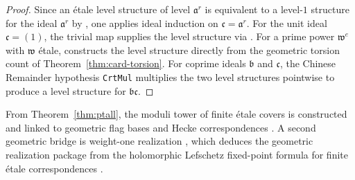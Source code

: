 \begin{proof}
Since an étale level structure of level $\mathfrak{a}^r$ is equivalent to a
level-$1$ structure for the ideal $\mathfrak{a}^r$ by , one
applies ideal induction on $\mathfrak{c} = \mathfrak{a}^r$. For the unit ideal
$\mathfrak{c} = (1)$, the trivial map supplies the level structure via
. For a prime power $\mathfrak{w}^e$ with $\mathfrak{w}$
étale, 
constructs the level structure directly from the geometric torsion count of
Theorem~\ref{thm:card-torsion}. For coprime ideals $\mathfrak{b}$ and
$\mathfrak{c}$, the Chinese Remainder hypothesis \texttt{CrtMul} multiplies the
two level structures pointwise to produce a level structure for
$\mathfrak{b}\mathfrak{c}$.
\end{proof}

From Theorem~\ref{thm:ptall}, the moduli tower of finite étale covers is
constructed and linked to geometric flag bases and Hecke correspondences
. A second geometric bridge is
weight-one realization , which
deduces the geometric realization package
 from the holomorphic Lefschetz
fixed-point formula for finite étale correspondences
.

